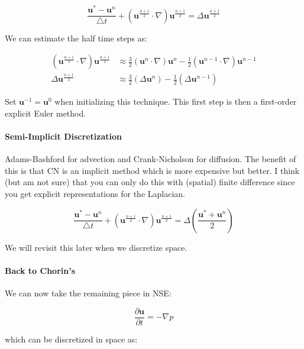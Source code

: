 \documentclass[12pt]{article}
\begin{document}
\begin{equation}
    \frac{\mathbf{u}^* - \mathbf{u}^n}{\bigtriangleup t} + (\mathbf{u}^{\frac{n+1}{2}} \cdot \nabla) \mathbf{u}^{\frac{n+1}{2}} = \Delta \mathbf{u}^{\frac{n+1}{2}}
\end{equation}

We can estimate the half time steps as:

\begin{align*}
    (\mathbf{u}^{\frac{n+1}{2}} \cdot \nabla) \mathbf{u}^{\frac{n+1}{2}} &\approx \frac{3}{2}(\mathbf{u}^{n} \cdot \nabla) \mathbf{u}^{n} - \frac{1}{2}(\mathbf{u}^{n-1} \cdot \nabla) \mathbf{u}^{n-1} \\
    \Delta \mathbf{u}^{\frac{n+1}{2}} &\approx \frac{3}{2}(\Delta \mathbf{u}^n) - \frac{1}{2}(\Delta \mathbf{u}^{n-1})
\end{align*}

Set $\mathbf{u}^{-1} = \mathbf{u}^0$ when initializing this technique. This first step is then a first-order explicit Euler method.

\paragraph{Semi-Implicit Discretization}
Adams-Bashford for advection and Crank-Nicholson for diffusion. The benefit of this is that CN is an implicit method which is more expensive but better. I think (but am not sure) that you can only do this with (spatial) finite difference since you get explicit representations for the Laplacian.

\begin{equation}
    \frac{\mathbf{u}^* - \mathbf{u}^n}{\bigtriangleup t} + (\mathbf{u}^{\frac{n+1}{2}} \cdot \nabla) \mathbf{u}^{\frac{n+1}{2}} = \Delta (\frac{\mathbf{u}^{*} + \mathbf{u}^{n}}{2})
\end{equation}

We will revisit this later when we discretize space.

\paragraph{Back to Chorin's}
We can now take the remaining piece in NSE:

\begin{equation}
    \frac{\partial \mathbf{u}}{\partial t} = -\nabla p
\end{equation}

which can be discretized in space as:
\end{document}
